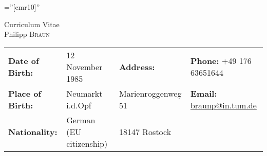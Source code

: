 \documentclass[a4paper,10pt]{article}
\begin{document}
\pagestyle{empty} %

\font\fb=''[cmr10]'' %

\par{\centering
		{\Large Curriculum Vitae}\vspace{0.3cm}\\
		{\Huge Philipp \textsc{Braun}
	}\bigskip\par}


\begin{tabularx}{19cm}{LLLL}
    \textbf{Date of Birth:} & 12 November 1985 & \textbf{Address:}& \textbf{Phone:} +49 176 63651644\\
    \textbf{Place of Birth:} & Neumarkt i.d.Opf  & Marienroggenweg 51 & \textbf{Email:}  \href{mailto:braunp@in.tum.de}{braunp@in.tum.de}\\
    \textbf{Nationality:} & German (EU citizenship) & 18147 Rostock& 
\end{tabularx}

\end{document}
